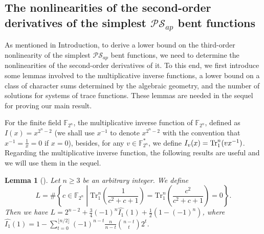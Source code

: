 \documentclass{article}
\newcommand{\F}{\mathbb{F}}
\newcommand{\0}{\textbf{0}}
\newcommand{\1}{\textbf{1}}
\theoremstyle{plain}
\newtheorem{lemma}{Lemma}
\begin{document}
    \subsection{The nonlinearities of the second-order derivatives of the simplest $\mathcal{PS}_{ap}$ bent functions}
    As mentioned in Introduction, to derive a lower bound on the third-order nonlinearity of the simplest $\mathcal{PS}_{ap}$ bent functions,
    we need to determine the nonlinearities of the second-order derivatives of it.
    To this end, we first introduce some lemmas involved to the multiplicative inverse functions,
    a lower bound on a class of character sums determined by the algebraic geometry,
    and the number of solutions for systems of trace functions.
    These lemmas are needed in the sequel for proving our main result.

    For the finite field $\F_{2^n}$, the multiplicative inverse function of $\F_{2^n}$, defined as $I(x)=x^{2^n-2}$ (we shall use $x^{-1}$ to denote $x^{2^n-2}$ with the convention that $x^{-1}=\frac{1}{x}=0$ if $x=0$), besides, for any $v\in\F_{2^n}^*$, we define $I_v(x)=\Tr_1^n(vx^{-1})$.
    Regarding the multiplicative inverse function, the following results are useful and we will use them in the sequel.

    \begin{lemma}[\cite{tang2022invfunc}]\label{L:SumInv00}
        Let $n\geq 3$ be an arbitrary integer.
        We define
        $$L=\#\left\{c\in\F_{2^n} \middle| \mathrm{Tr}_1^n\left(\frac{1}{c^2+c+1}\right)=\mathrm{Tr}_1^n\left(\frac{c^2}{c^2+c+1}\right)=0\right\}.$$
        Then we have $L=2^{n-2}+\frac{3}{4}(-1)^n\widehat{I_1}(1)+\frac{1}{2}\left(1-(-1)^n\right)$, where $\widehat{I_1}(1)=1-\sum_{t=0}^{\lfloor n/2\rfloor}(-1)^{n-t}\frac{n}{n-t}{{n-t}\choose {t}}2^t$.
    \end{lemma}

\end{document}
